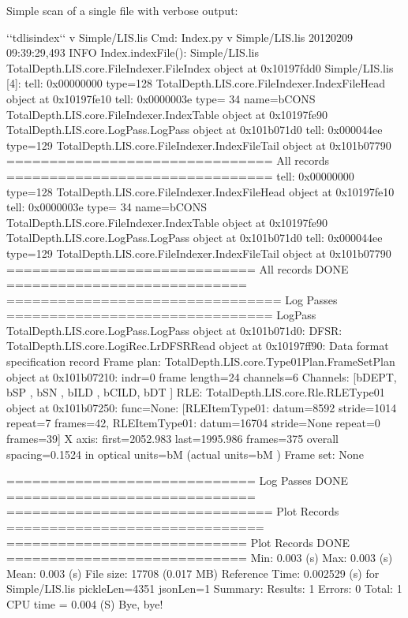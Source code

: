 \documentclass[letterpaper,10pt,english]{sphinxmanual}
\begin{document}
Simple scan of a single file with verbose output:

\begin{sphinxVerbatim}[commandchars=\\\{\}]
\PYGZdl{} {}`{}`tdlisindex{}`{}` \PYGZhy{}v Simple/LIS.lis
Cmd: Index.py \PYGZhy{}v Simple/LIS.lis
2012\PYGZhy{}02\PYGZhy{}09 09:39:29,493 INFO     Index.indexFile(): Simple/LIS.lis
\PYGZlt{}TotalDepth.LIS.core.FileIndexer.FileIndex object at 0x10197fdd0\PYGZgt{} \PYGZdq{}Simple/LIS.lis\PYGZdq{} [4]:
  tell: 0x00000000 type=128 \PYGZlt{}TotalDepth.LIS.core.FileIndexer.IndexFileHead object at 0x10197fe10\PYGZgt{}
  tell: 0x0000003e type= 34 name=b\PYGZsq{}CONS\PYGZsq{} \PYGZlt{}TotalDepth.LIS.core.FileIndexer.IndexTable object at 0x10197fe90\PYGZgt{}
  \PYGZlt{}TotalDepth.LIS.core.LogPass.LogPass object at 0x101b071d0\PYGZgt{}
  tell: 0x000044ee type=129 \PYGZlt{}TotalDepth.LIS.core.FileIndexer.IndexFileTail object at 0x101b07790\PYGZgt{}
=============================== All records ===============================
tell: 0x00000000 type=128 \PYGZlt{}TotalDepth.LIS.core.FileIndexer.IndexFileHead object at 0x10197fe10\PYGZgt{}
tell: 0x0000003e type= 34 name=b\PYGZsq{}CONS\PYGZsq{} \PYGZlt{}TotalDepth.LIS.core.FileIndexer.IndexTable object at 0x10197fe90\PYGZgt{}
\PYGZlt{}TotalDepth.LIS.core.LogPass.LogPass object at 0x101b071d0\PYGZgt{}
tell: 0x000044ee type=129 \PYGZlt{}TotalDepth.LIS.core.FileIndexer.IndexFileTail object at 0x101b07790\PYGZgt{}
============================= All records DONE ============================
================================ Log Passes ===============================
LogPass \PYGZlt{}TotalDepth.LIS.core.LogPass.LogPass object at 0x101b071d0\PYGZgt{}:
       DFSR: \PYGZlt{}TotalDepth.LIS.core.LogiRec.LrDFSRRead object at 0x10197ff90\PYGZgt{}: \PYGZdq{}Data format specification record\PYGZdq{}
 Frame plan: \PYGZlt{}TotalDepth.LIS.core.Type01Plan.FrameSetPlan object at 0x101b07210\PYGZgt{}: indr=0 frame length=24 channels=6
   Channels: [b\PYGZsq{}DEPT\PYGZsq{}, b\PYGZsq{}SP  \PYGZsq{}, b\PYGZsq{}SN  \PYGZsq{}, b\PYGZsq{}ILD \PYGZsq{}, b\PYGZsq{}CILD\PYGZsq{}, b\PYGZsq{}DT  \PYGZsq{}]
        RLE: \PYGZlt{}TotalDepth.LIS.core.Rle.RLEType01 object at 0x101b07250\PYGZgt{}: func=None: [RLEItemType01: datum=8592 stride=1014 repeat=7 frames=42, RLEItemType01: datum=16704 stride=None repeat=0 frames=39]
     X axis: first=2052.983 last=1995.986 frames=375 overall spacing=\PYGZhy{}0.1524 in optical units=b\PYGZsq{}M   \PYGZsq{} (actual units=b\PYGZsq{}M   \PYGZsq{})
  Frame set: None

============================= Log Passes DONE =============================
=============================== Plot Records ==============================
============================ Plot Records DONE ============================
   Min: 0.003 (s)
   Max: 0.003 (s)
  Mean: 0.003 (s)
File size: 17708 (0.017 MB) Reference Time: 0.002529 (s) for Simple/LIS.lis pickleLen=4351 jsonLen=\PYGZhy{}1
Summary:
Results:        1
 Errors:        0
  Total:        1
CPU time =    0.004 (S)
Bye, bye!
\end{sphinxVerbatim}
\end{document}
